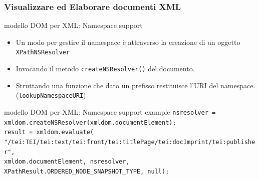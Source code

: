 \begin{frame}
    \frametitle{Visualizzare ed Elaborare documenti XML}
    \addtocounter{nframe}{1}
    

    \begin{block}{modello DOM per XML: Namespace support}
        \begin{itemize}
            \item Un modo per gestire il namespace è attraverso la creazione di un oggetto \texttt{XPathNSResolver}
            \item Invocando il metodo \texttt{createNSResolver()} del documento.
            \item Struttando una funzione che dato un prefisso restituisce l'URI del namespace. (\texttt{lookupNamespaceURI})
        \end{itemize}
    \end{block}

    \begin{block}{modello DOM per XML: Namespace support example}
        \texttt{nsresolver = xmldom.createNSResolver(xmldom.documentElement);} 
        \\\texttt{result = xmldom.evaluate(} \\\texttt{"/tei:TEI/tei:text/tei:front/tei:titlePage/tei:docImprint/tei:publisher",} \\\texttt{xmldom.documentElement, nsresolver, XPathResult.ORDERED_NODE_SNAPSHOT_TYPE, null);}
    \end{block}
     
\end{frame}

